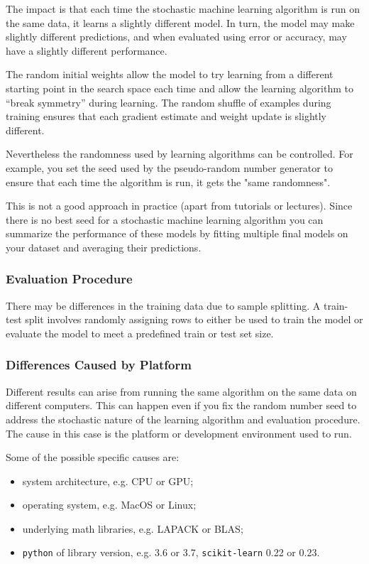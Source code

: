 The impact is that each time the stochastic machine learning algorithm is run on the same data, it learns a slightly different model. In turn, the model may make slightly different predictions, and when evaluated using error or accuracy, may have a slightly different performance.

The random initial weights allow the model to try learning from a different starting point in the search space each time and allow the learning algorithm to “break symmetry” during learning. The random shuffle of examples during training ensures that each gradient estimate and weight update is slightly different.

Nevertheless the randomness used by learning algorithms can be controlled. For example, you set the seed used by the pseudo-random number generator to ensure that each time the algorithm is run, it gets the "same randomness".

This is not a good approach in practice (apart from tutorials or lectures). Since there is no best seed for a stochastic machine learning algorithm you can summarize the performance of these models by fitting multiple final models on your dataset and averaging their predictions.

\subsubsection{Evaluation Procedure}

There may be differences in the training data due to sample splitting.
A train-test split involves randomly assigning rows to either be used to train the model or evaluate the model to meet a predefined train or test set size.

\subsubsection{Differences Caused by Platform}

Different results can arise from running the same algorithm on the same data on different computers.
This can happen even if you fix the random number seed to address the stochastic nature of the learning algorithm and evaluation procedure. The cause in this case is the platform or development environment used to run.

Some of the possible specific causes are:
\begin{itemize}
\tightlist
\item system architecture, e.g. CPU or GPU;
\item operating system, e.g. MacOS or Linux;
\item underlying math libraries, e.g. LAPACK or BLAS;
\item \texttt{python} of library version, e.g. 3.6 or 3.7, \texttt{scikit-learn} 0.22 or 0.23.
\end{itemize}

